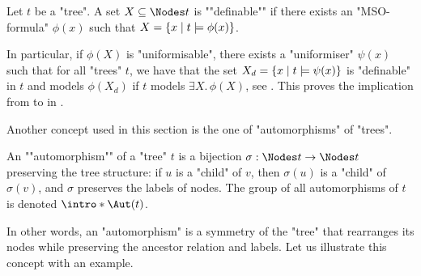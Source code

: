 \documentclass[a4paper,UKenglish,cleveref, autoref, thm-restate]{lipics-v2021}
\begin{document}
\begin{definition}\label{def:definable}
	\AP Let $t$ be a "tree". A set $X \subseteq \Nodes t$ is ""definable"" if there exists an
	"MSO-formula" $\phi(x)$ such that $X = \left\{x \mid t \models \phi(x)\right\}$.
\end{definition}

In particular, if $\phi(X)$ is "uniformisable", there exists a "uniformiser" $\psi(x)$ such that for all "trees" $t$,
we have that the set $X_d = \left\{x \mid t \models \psi(x)\right\}$ is "definable" in $t$ and models $\phi(X_d)$ if $t$ models $\exists X.\, \phi(X)$,
see .
This proves the implication from  to  in .

Another concept used in this section is the one of "automorphisms" of "trees".
\begin{definition}["automorphism"]\label{def:automorphism}
	\AP An ""automorphism"" of a "tree" $t$ is a bijection $\sigma : \Nodes t \to \Nodes t$ preserving the tree structure:
	if $u$ is a "child" of $v$, then $\sigma(u)$ is a "child" of $\sigma(v)$, and $\sigma$ preserves the labels of nodes.
	The group of all automorphisms of $t$ is denoted $\intro* \Aut(t)$.
\end{definition}

In other words, an "automorphism" is a symmetry of the "tree" that rearranges its nodes while preserving the ancestor relation and labels.
Let us illustrate this concept with an example.
\end{document}
